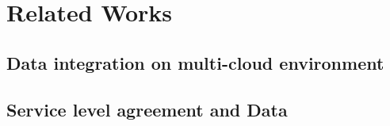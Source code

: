 \section{Related Works}\label{sec:rw}

\subsection{Data integration on multi-cloud environment}

\subsection{Service level agreement and Data}
